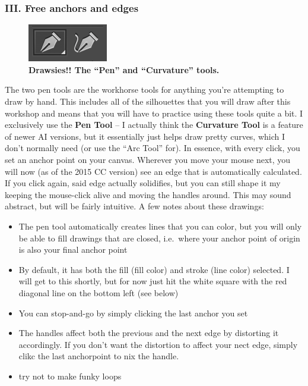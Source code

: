 \documentclass[]{article}
\providecommand{\tightlist}{%
  \setlength{\itemsep}{0pt}\setlength{\parskip}{0pt}}
\begin{document}
\subsubsection{III. Free anchors and
edges}\label{iii.-free-anchors-and-edges}

\begin{figure}
\centering
\includegraphics{Freeanchors.png}
\caption{\textbf{Drawsies!! The ``Pen'' and ``Curvature'' tools.}}
\end{figure}

The two pen tools are the workhorse tools for anything you're attempting
to draw by hand. This includes all of the silhouettes that you will draw
after this workshop and means that you will have to practice using these
tools quite a bit. I exclusively use the \textbf{Pen Tool} -- I actually
think the \textbf{Curvature Tool} is a feature of newer AI versions, but
it essentially just helps draw pretty curves, which I don't normally
need (or use the ``Arc Tool'' for). In essence, with every click, you
set an anchor point on your canvas. Wherever you move your mouse next,
you will now (as of the 2015 CC version) see an edge that is
automatically calculated. If you click again, said edge actually
solidifies, but you can still shape it my keeping the mouse-click alive
and moving the handles around. This may sound abstract, but will be
fairly intuitive. A few notes about these drawings:

\begin{itemize}
\tightlist
\item
  The pen tool automatically creates lines that you can color, but you
  will only be able to fill drawings that are closed, i.e.~where your
  anchor point of origin is also your final anchor point
\item
  By default, it has both the fill (fill color) and stroke (line color)
  selected. I will get to this shortly, but for now just hit the white
  square with the red diagonal line on the bottom left (see below)
\item
  You can stop-and-go by simply clicking the last anchor you set
\item
  The handles affect both the previous and the next edge by distorting
  it accordingly. If you don't want the distortion to affect your nect
  edge, simply clikc the last anchorpoint to nix the handle.
\item
  try not to make funky loops
\end{itemize}
\end{document}
